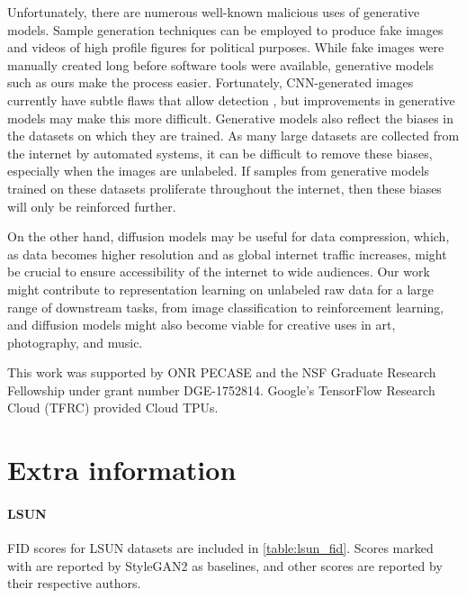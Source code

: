 \documentclass{article}
\begin{document}
Unfortunately, there are numerous well-known malicious uses of generative models. Sample generation techniques can be employed to produce fake images and videos of high profile figures for political purposes. While fake images were manually created long before software tools were available, generative models such as ours make the process easier. Fortunately, CNN-generated images currently have subtle flaws that allow detection \cite{wang2019cnngenerated}, but improvements in generative models may make this more difficult.
Generative models also reflect the biases in the datasets on which they are trained. As many large datasets are collected from the internet by automated systems, it can be difficult to remove these biases, especially when the images are unlabeled. If samples from generative models trained on these datasets proliferate throughout the internet, then these biases will only be reinforced further.

On the other hand, diffusion models may be useful for data compression, which, as data becomes higher resolution and as global internet traffic increases, might be crucial to ensure accessibility of the internet to wide audiences. Our work might contribute to representation learning on unlabeled raw data for a large range of downstream tasks, from image classification to reinforcement learning, and diffusion models might also become viable for creative uses in art, photography, and music.

\begin{ack}
This work was supported by ONR PECASE and the NSF Graduate Research Fellowship under grant number DGE-1752814. Google's TensorFlow Research Cloud (TFRC) provided Cloud TPUs.
\end{ack}

\setlength{\bibsep}{5pt}

{\small }

\pagebreak
\appendix

\section*{Extra information}

\paragraph{LSUN}

FID scores for LSUN datasets are included in \cref{table:lsun_fid}. Scores marked with  are reported by StyleGAN2 as baselines, and other scores are reported by their respective authors.
\end{document}
